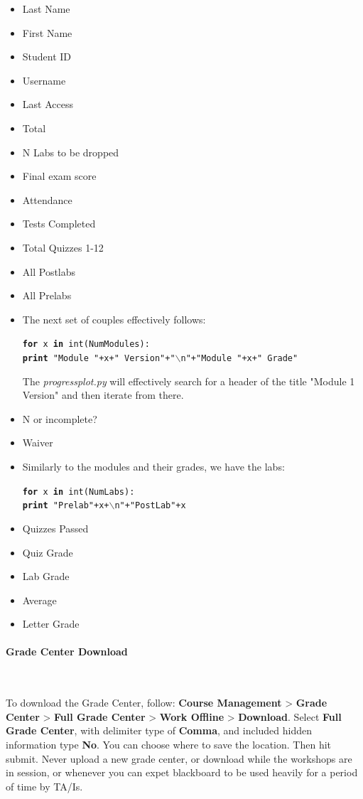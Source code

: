 \documentclass[12pt]{article}
\newcommand{\subsubsubsection}[1]{\paragraph{#1}\mbox{}\\}
\begin{document}
\begin{itemize}
	\item Last Name
	\item First Name
	\item Student ID
	\item Username
	\item Last Access
	\item Total
	\item N Labs to be dropped
	\item Final exam score
	\item Attendance
	\item Tests Completed
	\item Total Quizzes 1-12
	\item All Postlabs
	\item All Prelabs
	\item The next set of couples effectively follows:
	\begin{mdframed}[style=CommandFrame]
	\texttt{\textbf{for} x \textbf{in} int(NumModules): \\
			\hspace{10pt} \textbf{print} "Module "+x+" Version"+"$\backslash$n"+"Module "+x+" Grade"}
	\end{mdframed}
	The \emph{progressplot.py} will effectively search for a header of the title "Module 1 Version" and then iterate from there.
	\item N or incomplete?
	\item Waiver
	\item Similarly to the modules and their grades, we have the labs:
	\begin{mdframed}[style=CommandFrame]
	\texttt{\textbf{for} x \textbf{in} int(NumLabs): \\
			\hspace{10pt} \textbf{print} "Prelab"+x+$\backslash$n"+"PostLab"+x}
	\end{mdframed}
	\item Quizzes Passed
	\item Quiz Grade
	\item Lab Grade
	\item Average
	\item Letter Grade
\end{itemize}

\subsubsubsection{Grade Center Download} \label{sec:gradecenterdownload}

\noindent To download the Grade Center, follow: \textbf{Course Management} > \textbf{Grade Center} > \textbf{Full Grade Center} > \textbf{Work Offline} > \textbf{Download}. Select \textbf{Full Grade Center}, with delimiter type of \textbf{Comma}, and included hidden information type \textbf{No}. You can choose where to save the location. Then hit submit. Never upload a new grade center, or download while the workshops are in session, or whenever you can expet blackboard to be used heavily for a period of time by TA/Is.
\end{document}
